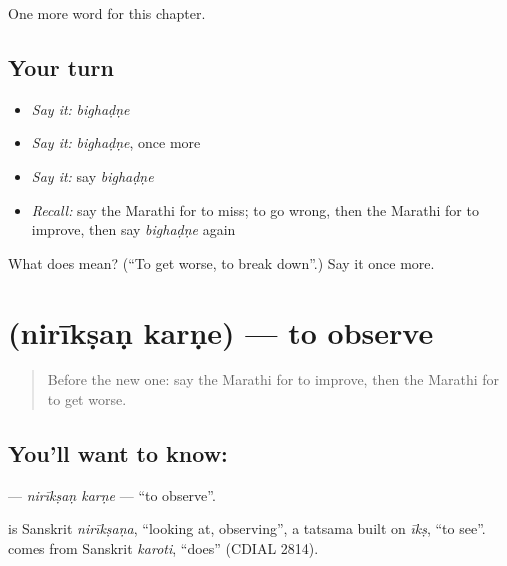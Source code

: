\begin{grammarlens}[title={What you've built}]
One more word for this chapter.
\end{grammarlens}

\subsection*{Your turn}
\begin{itemize}
\raggedright
  \item \emph{Say it:} \emph{bighaḍṇe}
  \item \emph{Say it:} \emph{bighaḍṇe}, once more
  \item \emph{Say it:} say \emph{bighaḍṇe}
  \item \emph{Recall:} say the Marathi for to miss; to go wrong, then the Marathi for to improve, then say \emph{bighaḍṇe} again
\end{itemize}

\begin{tcolorbox}[breakable,colback=teal!4,colframe=teal!35!black,title={Before you move on}]
What does  mean? (\textquotedblleft{}To get worse, to break down\textquotedblright{}.) Say it once more.
\end{tcolorbox}
\section[\texorpdfstring{\mr{निरीक्षण} \mr{करणे} (nirīkṣaṇ karṇe)}{निरीक्षण करणे (nirīkṣaṇ karṇe)}]{  (nirīkṣaṇ karṇe) — to observe}

\label{lesson:MR-C165-niriksan-karne}



\begin{quote}
Before the new one: say the Marathi for to improve, then the Marathi for to get worse.
\end{quote}

\subsection*{You'll want to know:  }
\textbf{ } — \emph{nirīkṣaṇ karṇe} — \textquotedblleft{}to observe\textquotedblright{}.

\begin{cousinweb}
\textbf{} is Sanskrit \emph{nirīkṣaṇa}, \textquotedblleft{}looking at, observing\textquotedblright{}, a tatsama built on \emph{īkṣ}, \textquotedblleft{}to see\textquotedblright{}. \textbf{} comes from Sanskrit \emph{karoti}, \textquotedblleft{}does\textquotedblright{} (CDIAL 2814).
\end{cousinweb}

